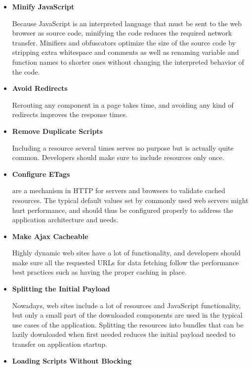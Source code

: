 \begin{itemize}
\item \textbf{Minify JavaScript}

  Because JavaScript is an interpreted language that must be sent to
  the web browser as source code, minifying the code reduces the
  required network transfer. Minifiers and obfuscators optimize the
  size of the source code by stripping extra whitespace and comments
  as well as renaming variable and function names to shorter ones
  without changing the interpreted behavior of the code.

\item \textbf{Avoid Redirects}

  Rerouting any component in a page takes time, and avoiding any kind
  of redirects improves the response times.

\item \textbf{Remove Duplicate Scripts}

  Including a resource several times serves no purpose but is actually
  quite common. Developers should make sure to include resources only
  once.

\item \textbf{Configure ETags}

   are a mechanism in HTTP for servers and browsers to
  validate cached resources. The typical default values set by
  commonly used web servers might hurt performance, and should thus be
  configured properly to address the application architecture and
  needs.

\item \textbf{Make Ajax Cacheable}

  Highly dynamic web sites have a lot of 
  \cite{garrett2005ajax} functionality, and developers should make
  sure all the requested URLs for data fetching follow the performance
  best practices such as having the proper caching in place.


\item \textbf{Splitting the Initial Payload}

  Nowadays, web sites include a lot of resources and JavaScript
  functionality, but only a small part of the downloaded components
  are used in the typical use cases of the application. Splitting the
  resources into bundles that can be lazily downloaded when first
  needed reduces the initial payload needed to transfer on application
  startup.

\item \textbf{Loading Scripts Without Blocking}


\end{itemize}

